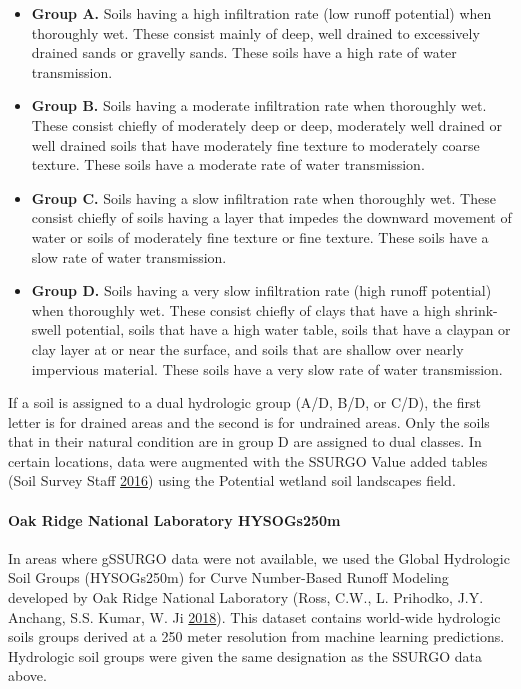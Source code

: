 \documentclass[
]{report}
\begin{document}
\begin{itemize}
\item
  \textbf{Group A.} Soils having a high infiltration rate (low runoff potential) when thoroughly wet.
  These consist mainly of deep, well drained to excessively drained sands or gravelly sands.
  These soils have a high rate of water transmission.
\item
  \textbf{Group B.} Soils having a moderate infiltration rate when thoroughly wet. These consist
  chiefly of moderately deep or deep, moderately well drained or well drained soils that have
  moderately fine texture to moderately coarse texture. These soils have a moderate rate of
  water transmission.
\item
  \textbf{Group C.} Soils having a slow infiltration rate when thoroughly wet. These consist chiefly of
  soils having a layer that impedes the downward movement of water or soils of moderately
  fine texture or fine texture. These soils have a slow rate of water transmission.
\item
  \textbf{Group D.} Soils having a very slow infiltration rate (high runoff potential) when thoroughly
  wet. These consist chiefly of clays that have a high shrink-swell potential, soils that have a
  high water table, soils that have a claypan or clay layer at or near the surface, and soils that
  are shallow over nearly impervious material. These soils have a very slow rate of water
  transmission.
\end{itemize}

If a soil is assigned to a dual hydrologic group (A/D, B/D, or C/D), the first letter is for
drained areas and the second is for undrained areas. Only the soils that in their natural
condition are in group D are assigned to dual classes. In certain locations, data were augmented with the SSURGO Value added tables (Soil Survey Staff \protect\hyperlink{ref-SoilSurveyStaff2016}{2016}) using the Potential wetland soil landscapes field.

\hypertarget{oak-ridge-national-laboratory-hysogs250m}{%
\paragraph{Oak Ridge National Laboratory HYSOGs250m}\label{oak-ridge-national-laboratory-hysogs250m}}

In areas where gSSURGO data were not available, we used the Global Hydrologic Soil Groups (HYSOGs250m) for Curve Number-Based Runoff Modeling developed by Oak Ridge National Laboratory (Ross, C.W., L. Prihodko, J.Y. Anchang, S.S. Kumar, W. Ji \protect\hyperlink{ref-RossC.W.L.PrihodkoJ.Y.AnchangS.S.KumarW.Ji2018}{2018}). This dataset contains world-wide hydrologic soils groups derived at a 250 meter resolution from machine learning predictions. Hydrologic soil groups were given the same designation as the SSURGO data above.
\end{document}

